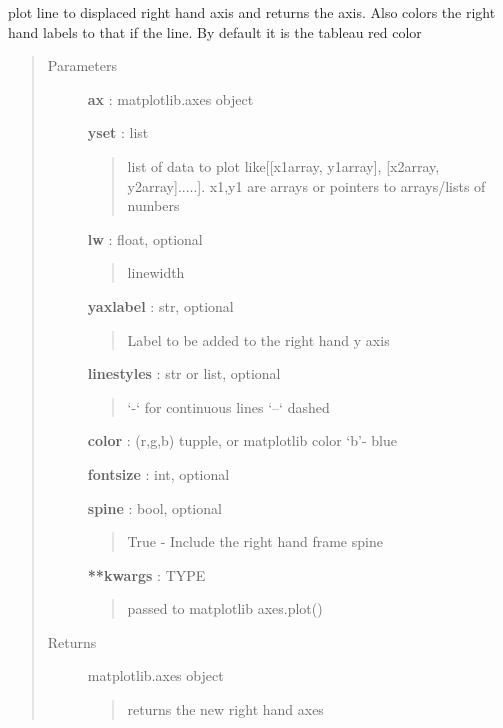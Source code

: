 \documentclass[letterpaper,10pt,english]{sphinxmanual}
\begin{document}

\begin{fulllineitems}
\label{pubplots:pubplots.plot.plot_lright2}
plot line to displaced right hand axis and returns the axis.
Also colors the right hand labels to that if the
line. By default it is the tableau red color
\begin{quote}\begin{description}
\item[{Parameters}] \leavevmode
\textbf{ax} : matplotlib.axes object

\textbf{yset} : list
\begin{quote}

list of data to plot like{[}{[}x1array, y1array{]}, {[}x2array, y2array{]}.....{]}.
x1,y1 are arrays or pointers to arrays/lists of numbers
\end{quote}

\textbf{lw} : float, optional
\begin{quote}

linewidth
\end{quote}

\textbf{yaxlabel} : str, optional
\begin{quote}

Label to be added to the right hand y axis
\end{quote}

\textbf{linestyles} : str or list, optional
\begin{quote}

`-` for continuous lines `--` dashed
\end{quote}

\textbf{color} : (r,g,b) tupple, or matplotlib color `b'- blue

\textbf{fontsize} : int, optional

\textbf{spine} : bool, optional
\begin{quote}

True - Include the right hand frame spine
\end{quote}

\textbf{**kwargs} : TYPE
\begin{quote}

passed to matplotlib axes.plot()
\end{quote}

\item[{Returns}] \leavevmode
matplotlib.axes object
\begin{quote}

returns the new right hand axes
\end{quote}

\end{description}\end{quote}

\end{fulllineitems}
\end{document}
